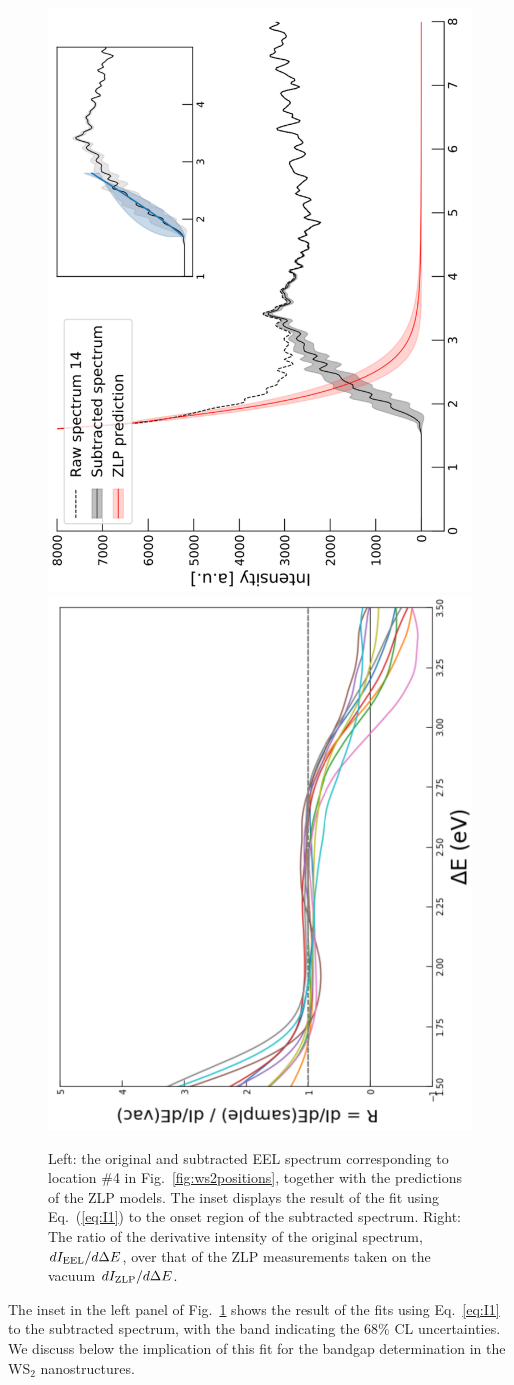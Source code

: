 \begin{figure}[t]
\begin{centering}
  \includegraphics[width=0.36\linewidth,angle=-90]{plots/sp4_subtracted_spectrum.pdf}
   \includegraphics[width=0.36\linewidth,angle=-90]{plots/derivatives.pdf}
   \caption{Left: the original
     and subtracted EEL spectrum corresponding to location \#4 in Fig.~\ref{fig:ws2positions},
     together with the predictions of the ZLP models.
     The inset displays the result of the fit using Eq.~(\ref{eq:I1}) to the onset
     region of the subtracted spectrum.
     Right: The ratio of the derivative intensity of the original spectrum, $dI_{\rm EEL}/d\Delta E$,
     over that of the ZLP measurements taken on the vacuum $d I_{\rm ZLP}/d\Delta E$.
  }
\label{fig:sp4_subtracted_spectrum}
\end{centering}
\end{figure}

The inset in the left panel of Fig.~\ref{fig:sp4_subtracted_spectrum}
shows the result of the  fits using Eq.~\ref{eq:I1} to the subtracted spectrum,
with the band indicating the 68\% CL uncertainties.
%
We discuss below the implication of this fit for the bandgap determination
in the WS$_2$ nanostructures.

